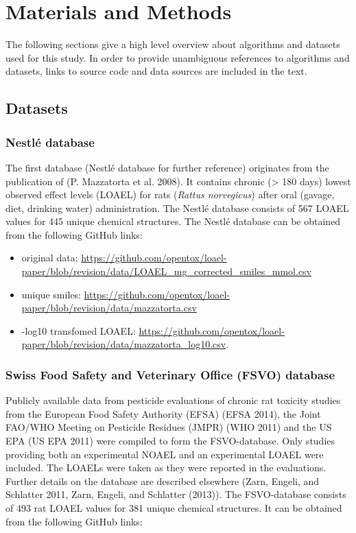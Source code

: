 \documentclass[]{achemso}
\providecommand{\tightlist}{%
  \setlength{\itemsep}{0pt}\setlength{\parskip}{0pt}}
\begin{document}
\section{Materials and Methods}\label{materials-and-methods}

The following sections give a high level overview about algorithms and
datasets used for this study. In order to provide unambiguous references
to algorithms and datasets, links to source code and data sources are
included in the text.

\subsection{Datasets}\label{datasets}

\subsubsection{Nestlé database}\label{nestluxe9-database}

The first database (Nestlé database for further reference) originates
from the publication of (P. Mazzatorta et al. 2008). It contains chronic
(\textgreater{} 180 days) lowest observed effect levels (LOAEL) for rats
(\emph{Rattus norvegicus}) after oral (gavage, diet, drinking water)
administration. The Nestlé database consists of 567 LOAEL values for 445
unique chemical structures. The Nestlé database can be obtained from the
following GitHub links:

\begin{itemize}
\tightlist
\item
  original data:
  \url{https://github.com/opentox/loael-paper/blob/revision/data/LOAEL_mg_corrected_smiles_mmol.csv}
\item
  unique smiles:
  \url{https://github.com/opentox/loael-paper/blob/revision/data/mazzatorta.csv}
\item
  -log10 transfomed LOAEL:
  \url{https://github.com/opentox/loael-paper/blob/revision/data/mazzatorta_log10.csv}.
\end{itemize}

\subsubsection{Swiss Food Safety and Veterinary Office (FSVO)
database}\label{swiss-food-safety-and-veterinary-office-fsvo-database}

Publicly available data from pesticide evaluations of chronic rat
toxicity studies from the European Food Safety Authority (EFSA) (EFSA
2014), the Joint FAO/WHO Meeting on Pesticide Residues (JMPR) (WHO 2011)
and the US EPA (US EPA 2011) were compiled to form the FSVO-database.
Only studies providing both an experimental NOAEL and an experimental
LOAEL were included. The LOAELs were taken as they were reported in the
evaluations. Further details on the database are described elsewhere
(Zarn, Engeli, and Schlatter 2011, Zarn, Engeli, and Schlatter (2013)).
The FSVO-database consists of 493 rat LOAEL values for 381 unique
chemical structures. It can be obtained from the following GitHub links:
\end{document}
